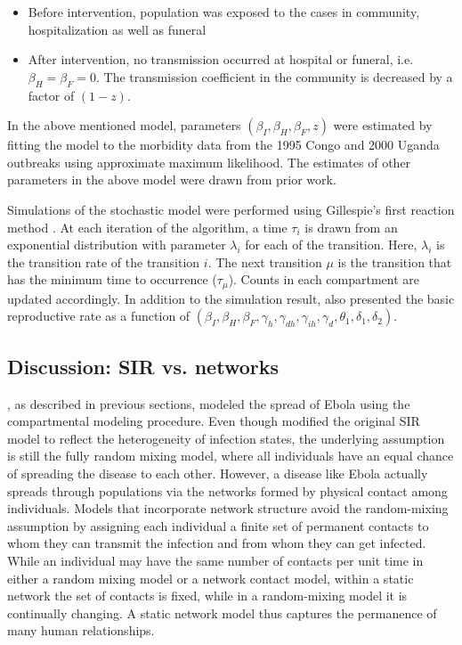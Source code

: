 \documentclass[10pt, journal,onecolumn]{IEEEtran}
\begin{document}
\begin{itemize}
\item Before intervention, population was exposed to the cases in community, hospitalization as well as funeral
\item After intervention, no transmission occurred at hospital or funeral, i.e. $\beta_H = \beta_F = 0$. The transmission coefficient in the community is decreased by a factor of $(1-z)$.
\end{itemize}

In the above mentioned model, parameters $(\beta_I, \beta_H, \beta_F , z)$ were estimated by fitting
the model to the morbidity data from the 1995 Congo and 2000 Uganda outbreaks using approximate maximum
likelihood. The estimates of other parameters in the above model were drawn from prior work.

Simulations of the stochastic model were performed using Gillespie's first reaction method \citep{gillespie1976general}. At each iteration of the algorithm, a time $\tau_i$ is drawn from an exponential distribution with parameter $\lambda_i$ for each of the transition. Here, $\lambda_i$ is the transition rate of the transition $i$. The next transition $\mu$ is the transition that has the minimum time to occurrence ($\tau_\mu$). Counts in each compartment are updated accordingly. In addition to the simulation result,  \citep{legrand2007understanding} also presented the basic reproductive rate as a function of $(\beta_I,\beta_H,\beta_F,\gamma_h,\gamma_{dh},\gamma_{ih},\gamma_d,\theta_1,\delta_1,\delta_2)$.


\subsection{\textbf{Discussion: SIR \citep{chowell2004basic, legrand2007understanding} vs. networks \citep{newman2002spread}}}

\citep{chowell2004basic, legrand2007understanding}, as described in previous sections, modeled the spread of Ebola using the
compartmental modeling procedure. Even though \citep{legrand2007understanding} modified the original
SIR model to reflect the heterogeneity of infection states, the underlying assumption is still the
fully random mixing model, where all individuals have an equal chance of spreading the disease to each other.
However, a disease like Ebola actually spreads through populations via the networks formed by physical
contact among individuals. Models that incorporate network structure avoid the random-mixing
assumption by assigning each individual a finite set of permanent contacts to whom they can
transmit the infection and from whom they can get infected.
While an individual may have the same number of contacts per unit
time in either a random mixing model or a network contact model, within a static network the set of
contacts is fixed, while in a random-mixing model it is continually changing.
A static network model thus captures the permanence of many human relationships.
\end{document}
